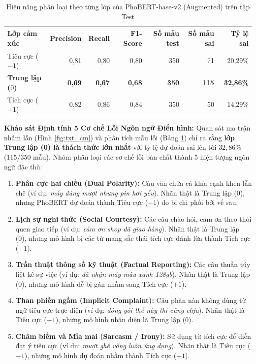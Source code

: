 \documentclass[a4paper,11pt]{article}
\begin{document}
\begin{table}[H]
\centering
\caption{Hiệu năng phân loại theo từng lớp của PhoBERT-base-v2 (Augmented) trên tập Test}
\label{tab:phobert_class}
\begin{tabular}{lrrrrrr}
\toprule
\textbf{Lớp cảm xúc} & \textbf{Precision} & \textbf{Recall} & \textbf{F1-Score} & \textbf{Số mẫu test} & \textbf{Số mẫu sai} & \textbf{Tỷ lệ sai} \\
\midrule
Tiêu cực ($-1$) & 0{,}81 & 0{,}80 & 0{,}80 & 350 & 71 & 20{,}29\% \\
\textbf{Trung lập ($0$)} & \textbf{0{,}69} & \textbf{0{,}67} & \textbf{0{,}68} & \textbf{350} & \textbf{115} & \textbf{32{,}86\%} \\
Tích cực ($+1$) & 0{,}82 & 0{,}86 & 0{,}84 & 350 & 50 & 14{,}29\% \\
\bottomrule
\end{tabular}
\end{table}

\noindent \textbf{Khảo sát Định tính 5 Cơ chế Lỗi Ngôn ngữ Điển hình:}
Quan sát ma trận nhầm lẫn (Hình \ref{fig:txt_cm}) và phân tích mẫu lỗi (Bảng \ref{tab:phobert_class}) chỉ ra rằng \textbf{lớp Trung lập (0) là thách thức lớn nhất} với tỷ lệ dự đoán sai lên tới $32{,}86\%$ (115/350 mẫu). Nhóm phân loại các cơ chế lỗi bản chất thành 5 hiện tượng ngôn ngữ đặc thù:
\begin{enumerate}
    \item \textbf{Phân cực hai chiều (Dual Polarity):} Câu văn chứa cả khía cạnh khen lẫn chê (ví dụ: \textit{máy dùng mượt nhưng pin hơi yếu}). Nhãn thật là Trung lập (0), nhưng PhoBERT dự đoán thành Tiêu cực ($-1$) do bị chi phối bởi vế sau.
    \item \textbf{Lịch sự nghi thức (Social Courtesy):} Các câu chào hỏi, cảm ơn theo thói quen giao tiếp (ví dụ: \textit{cảm ơn shop đã giao hàng}). Nhãn thật là Trung lập (0), nhưng mô hình bị các từ mang sắc thái tích cực đánh lừa thành Tích cực ($+1$).
    \item \textbf{Trần thuật thông số kỹ thuật (Factual Reporting):} Các câu thuần túy liệt kê sự việc (ví dụ: \textit{đã nhận máy màu xanh 128gb}). Nhãn thật là Trung lập (0), nhưng mô hình dễ bị gán nhầm sang Tích cực ($+1$).
    \item \textbf{Than phiền ngầm (Implicit Complaint):} Câu phàn nàn không dùng từ ngữ tiêu cực trực diện (ví dụ: \textit{đóng gói thế này thì cũng chịu}). Nhãn thật là Tiêu cực ($-1$), nhưng mô hình nhận diện là Trung lập (0).
    \item \textbf{Châm biếm và Mỉa mai (Sarcasm / Irony):} Sử dụng từ tích cực để diễn đạt ý tiêu cực (ví dụ: \textit{mượt ghê văng luôn ứng dụng}). Nhãn thật là Tiêu cực ($-1$), nhưng mô hình dự đoán nhầm thành Tích cực ($+1$).
\end{enumerate}
\end{document}
